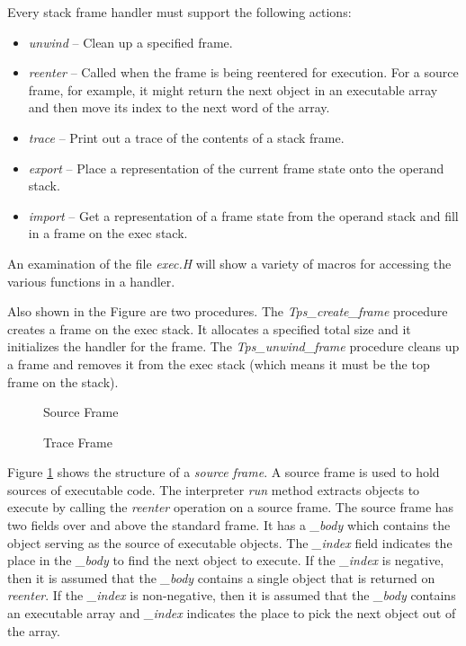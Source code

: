 Every stack frame handler must support the following actions:
\begin{itemize}
\item {\em unwind} --
    Clean up a specified frame.
\item {\em reenter} --
    Called when the frame is being reentered for execution.
    For a source frame, for example, it might return the next
    object in an executable array and then move its index to the
    next word of the array.
\item {\em trace} --
    Print out a trace of the contents of a stack frame.
\item {\em export} --
    Place a representation of the current frame state onto the operand stack.
\item {\em import} --
    Get a representation of a frame state from the operand stack
    and fill in a frame on the exec stack.
\end{itemize}
An examination of the file {\em exec.H} will show
a variety of macros for accessing the various functions in a handler.

Also shown in the Figure are two procedures.
The {\em Tps\_create\_frame} procedure
creates a frame on the exec stack.  It allocates a specified total
size and it initializes the handler for the frame.
The {\em Tps\_unwind\_frame} procedure
cleans up a frame and removes it from the exec stack
(which means it must be the top frame on the stack).

\begin{figure}[t]\centering

\caption{Source Frame}
\label{execf2}
\end{figure}
\begin{figure}[t]\centering

\caption{Trace Frame}
\label{execf3}
\horizontalline
\end{figure}

Figure \ref{execf2} shows the structure of a {\em source frame}.
A source frame is used to hold sources of executable code.
The interpreter {\em run} method extracts objects to execute
by calling the {\em reenter} operation on a source frame.
The source frame has two fields over and above the standard frame.
It has a {\em \_body} which contains the object serving as the source
of executable objects.  The {\em \_index} field
indicates the place in the
{\em \_body}
to find the next object
to execute.
If the
{\em \_index} is negative, then it is assumed that the
{\em \_body}
contains a single object that is returned on {\em reenter}.
If the
{\em \_index} is non-negative, then it is assumed that the
{\em \_body}
contains an executable array and
{\em \_index} indicates the place to pick the next object
out of the array.

